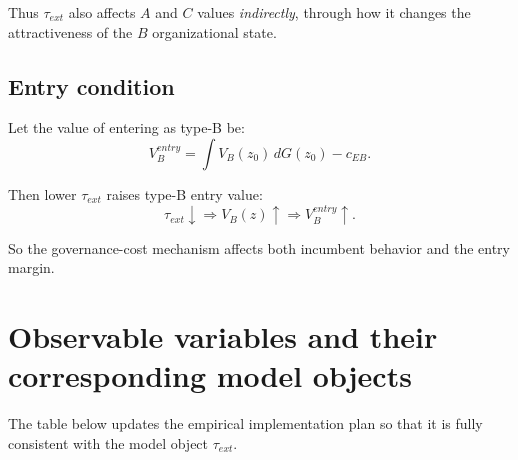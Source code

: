 \documentclass[12pt]{ctexart}
\begin{document}
Thus \(\tau_{ext}\) also affects \(A\) and \(C\) values \emph{indirectly}, through how it changes
the attractiveness of the \(B\) organizational state.

\subsection{Entry condition}

Let the value of entering as type-B be:
\[
V_B^{entry}
=
\int V_B(z_0)\,dG(z_0)-c_{EB}.
\]

Then lower \(\tau_{ext}\) raises type-B entry value:
\[
\tau_{ext}\downarrow
\Rightarrow
V_B(z)\uparrow
\Rightarrow
V_B^{entry}\uparrow.
\]

So the governance-cost mechanism affects both incumbent behavior and the entry margin.

\section{Observable variables and their corresponding model objects}

The table below updates the empirical implementation plan so that it is fully consistent
with the model object \(\tau_{ext}\).
\end{document}
